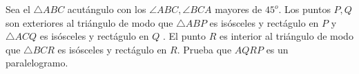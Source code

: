 \begin{problem}
	Sea el $\triangle ABC$ acutángulo con los $\angle ABC,\angle BCA $ mayores de $45^{o}$. Los puntos $P,Q$ son exteriores al triángulo de modo que $\triangle ABP$ es isósceles y rectágulo en $P$ y $\triangle ACQ$ es isósceles y rectágulo en $Q$ . El punto $R$ es interior al triángulo de modo que $\triangle BCR$ es isósceles y rectágulo en $R$. Prueba que $AQRP$ es un paralelogramo.
\end{problem}